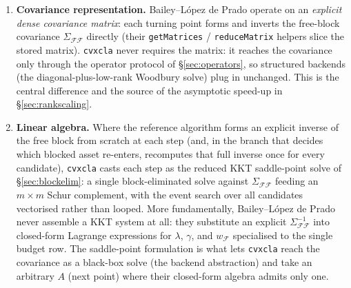 \documentclass[11pt]{article}
\newcommand{\Sig}{\Sigma}
\newcommand{\F}{\mathcal{F}}        %
\newcommand{\inv}{^{-1}}
\begin{document}
\begin{enumerate}
\item \textbf{Covariance representation.} Bailey--L\'opez de Prado operate on an
\emph{explicit dense covariance matrix}: each turning point forms and inverts the
free-block covariance $\Sig_{\F\F}$ directly (their \texttt{getMatrices} /
\texttt{reduceMatrix} helpers slice the stored matrix). \texttt{cvxcla} never
requires the matrix: it reaches the covariance only through the operator protocol
of \S\ref{sec:operators}, so structured backends (the diagonal-plus-low-rank
Woodbury solve) plug in unchanged. This is the central difference and the source
of the asymptotic speed-up in \S\ref{sec:rankscaling}.

\item \textbf{Linear algebra.} Where the reference algorithm forms an explicit
inverse of the free block from scratch at each step (and, in the branch that
decides which blocked asset re-enters, recomputes that full inverse once for every
candidate), \texttt{cvxcla} casts each step as the reduced KKT saddle-point solve
of \S\ref{sec:blockelim}: a single block-eliminated solve against $\Sig_{\F\F}$
feeding an $m \times m$ Schur complement, with the event search over all
candidates vectorised rather than looped. More fundamentally, Bailey--L\'opez de
Prado never assemble a KKT system at all: they substitute an explicit
$\Sig_{\F\F}\inv$ into closed-form Lagrange expressions for $\lambda$, $\gamma$,
and $w_\F$ specialised to the single budget row. The saddle-point formulation is
what lets \texttt{cvxcla} reach the covariance as a black-box solve (the backend
abstraction) and take an arbitrary $A$ (next point) where their closed-form
algebra admits only one.


\end{enumerate}
\end{document}
